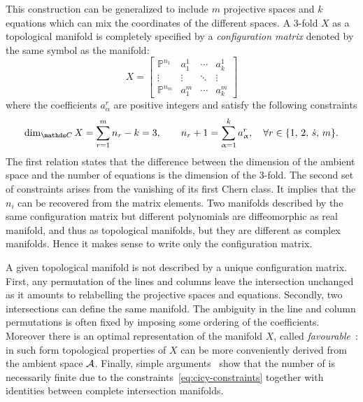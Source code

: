 This construction can be generalized to include $m$ projective spaces and $k$ equations which can mix the coordinates of the different spaces.
A \cicy $3$-fold $X$ as a topological manifold is completely specified by a \emph{configuration matrix} denoted by the same symbol as the manifold:
\begin{equation}
  X =
  \left[
    \begin{array}{c|ccc}
      \mathds{P}^{n_1} & a_1^1 & \cdots & a_k^1
      \\
      \vdots & \vdots & \ddots & \vdots
      \\
      \mathds{P}^{n_m} & a_1^m & \cdots & a_k^m
    \end{array}
  \right]
\end{equation}
where the coefficients $a^r_{\alpha}$ are positive integers and satisfy the following constraints
\begin{equation}
  \dim_{\C} X = \finitesum{r}{1}{m} n_r - k = 3,
  \qquad
  n_r + 1 = \sum_{\alpha=1}^k a_\alpha^r,
  \quad
  \forall r \in \qty{1,\, 2,\, \dots,\, m}.
  \label{eq:cicy-constraints}
\end{equation}
The first relation states that the difference between the dimension of the ambient space and the number of equations is the dimension of the \cy $3$-fold.
The second set of constraints arises from the vanishing of its first Chern class.
It implies that the $n_i$ can be recovered from the matrix elements.
Two manifolds described by the same configuration matrix but different polynomials are diffeomorphic as real manifold, and thus as topological manifolds, but they are different as complex manifolds.
Hence it makes sense to write only the configuration matrix.

A given topological manifold is not described by a unique configuration matrix.
First, any permutation of the lines and columns leave the intersection unchanged as it amounts to relabelling the projective spaces and equations.
Secondly, two intersections can define the same manifold.
The ambiguity in the line and column permutations is often fixed by imposing some ordering of the coefficients.
Moreover there is an optimal representation of the manifold $X$, called \emph{favourable}~\cite{Anderson:2017:FibrationsCICYThreefolds}: in such form topological properties of $X$ can be more conveniently derived from the ambient space $\mathcal{A}$.
Finally, simple arguments~\cite{Green:1987:CalabiYauManifoldsComplete, Candelas:1988:CompleteIntersectionCalabiYau, Lutken:1988:RecentProgressCalabiYauology} show that the number of \cicy is necessarily finite due to the constraints~\eqref{eq:cicy-constraints} together with identities between complete intersection manifolds.


